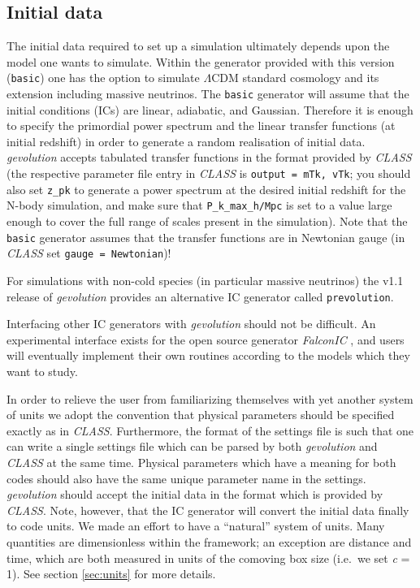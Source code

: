 \documentclass[a4paper,10pt]{article}
\begin{document}
\subsection{Initial data}
\label{sec:IC}

The initial data required to set up a simulation ultimately depends upon the model one wants to simulate. Within the generator provided with
this version (\texttt{basic}) one has the option to simulate $\mathsf{\Lambda}$CDM standard cosmology and its extension including massive
neutrinos. The \texttt{basic} generator will assume that the initial conditions (ICs) are linear, adiabatic, and Gaussian. Therefore it is
enough to specify the primordial power spectrum and the linear transfer functions (at initial redshift) in order to generate a random
realisation of initial data.
\textit{gevolution} accepts tabulated transfer functions in the format provided by \textit{CLASS} (the respective parameter file entry in
\textit{CLASS} is \texttt{output = mTk, vTk}; you should also set \texttt{z\_pk} to generate a power spectrum at the desired initial
redshift for the N-body simulation, and make sure that \texttt{P\_k\_max\_h/Mpc} is set to a value large enough to cover the full range of
scales present in the simulation). Note that the \texttt{basic} 
generator assumes that the transfer functions are in Newtonian gauge (in \textit{CLASS} set \texttt{gauge = Newtonian})!

For simulations with non-cold species (in particular massive neutrinos) the v1.1 release of \textit{gevolution} provides an alternative IC
generator called \texttt{prevolution}.

Interfacing other IC generators with \textit{gevolution} should not be difficult. An experimental interface exists for the
open source generator \textit{FalconIC} \cite{Valkenburg:2015dsa}, and users will eventually implement their own routines according to the
models which they want to study.

In order to relieve the user from familiarizing themselves with yet another system of units we adopt the convention that physical parameters
should be specified exactly as in \textit{CLASS}. Furthermore, the format of the settings file is such that one can write a single settings
file which can be parsed by both \textit{gevolution} and \textit{CLASS} at the same time. Physical parameters which have a meaning for both
codes should also have the same unique parameter name in the settings. \textit{gevolution} should accept the initial data in the format
which is provided by \textit{CLASS}. Note, however, that the IC generator will convert the initial data finally to code units. We made an
effort to have a ``natural'' system of units. Many quantities are dimensionless within the framework; an exception are distance and time,
which are both measured in units of the comoving box size (i.e.\ we set \textit{c} = 1). See section \ref{sec:units} for more details.
\end{document}
